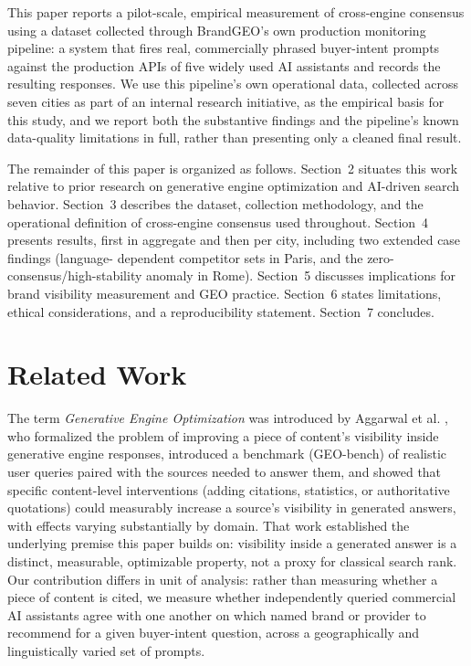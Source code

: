 \documentclass[11pt]{article}
\begin{document}
This paper reports a pilot-scale, empirical measurement of cross-engine consensus using
a dataset collected through BrandGEO's own production monitoring pipeline: a system
that fires real, commercially phrased buyer-intent prompts against the production APIs
of five widely used AI assistants and records the resulting responses. We use this
pipeline's own operational data, collected across seven cities as part of an internal
research initiative, as the empirical basis for this study, and we report both the
substantive findings and the pipeline's known data-quality limitations in full, rather
than presenting only a cleaned final result.

The remainder of this paper is organized as follows. Section~2 situates this work
relative to prior research on generative engine optimization and AI-driven search
behavior. Section~3 describes the dataset, collection methodology, and the operational
definition of cross-engine consensus used throughout. Section~4 presents results,
first in aggregate and then per city, including two extended case findings (language-
dependent competitor sets in Paris, and the zero-consensus/high-stability anomaly in
Rome). Section~5 discusses implications for brand visibility measurement and GEO
practice. Section~6 states limitations, ethical considerations, and a reproducibility
statement. Section~7 concludes.

\section{Related Work}

The term \emph{Generative Engine Optimization} was introduced by Aggarwal et al. \citep{aggarwal2024geo},
who formalized the problem of improving a piece of content's visibility inside
generative engine responses, introduced a benchmark (GEO-bench) of realistic user
queries paired with the sources needed to answer them, and showed that specific
content-level interventions (adding citations, statistics, or authoritative quotations)
could measurably increase a source's visibility in generated answers, with effects
varying substantially by domain. That work established the underlying premise this
paper builds on: visibility inside a generated answer is a distinct, measurable,
optimizable property, not a proxy for classical search rank. Our contribution differs
in unit of analysis: rather than measuring whether a piece of content is cited, we
measure whether independently queried commercial AI assistants agree with one another
on which named brand or provider to recommend for a given buyer-intent question, across
a geographically and linguistically varied set of prompts.
\end{document}
